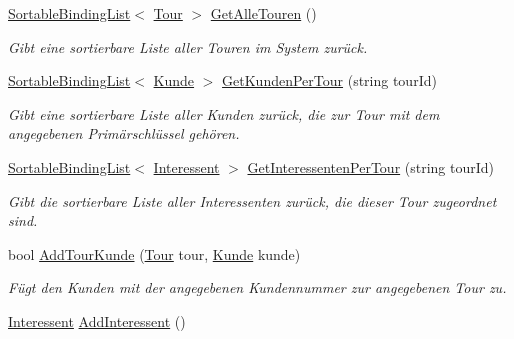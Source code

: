 \begin{DoxyCompactItemize}
\item 
\hyperlink{class_products_1_1_common_1_1_sortable_binding_list}{Sortable\+Binding\+List}$<$ \hyperlink{class_products_1_1_model_1_1_entities_1_1_tour}{Tour} $>$ \hyperlink{class_products_1_1_model_1_1_model_service_a88b7bd84f60f0e33daecd256ad1fedbe}{Get\+Alle\+Touren} ()
\begin{DoxyCompactList}\small\item\em Gibt eine sortierbare Liste aller Touren im System zurück. \end{DoxyCompactList}\item 
\hyperlink{class_products_1_1_common_1_1_sortable_binding_list}{Sortable\+Binding\+List}$<$ \hyperlink{class_products_1_1_model_1_1_entities_1_1_kunde}{Kunde} $>$ \hyperlink{class_products_1_1_model_1_1_model_service_affe72e69d5ef4c9eff6602746e4c8e8a}{Get\+Kunden\+Per\+Tour} (string tour\+Id)
\begin{DoxyCompactList}\small\item\em Gibt eine sortierbare Liste aller Kunden zurück, die zur Tour mit dem angegebenen Primärschlüssel gehören. \end{DoxyCompactList}\item 
\hyperlink{class_products_1_1_common_1_1_sortable_binding_list}{Sortable\+Binding\+List}$<$ \hyperlink{class_products_1_1_model_1_1_entities_1_1_interessent}{Interessent} $>$ \hyperlink{class_products_1_1_model_1_1_model_service_aae65874b0774cfe7b3fab8acd5536bc7}{Get\+Interessenten\+Per\+Tour} (string tour\+Id)
\begin{DoxyCompactList}\small\item\em Gibt die sortierbare Liste aller Interessenten zurück, die dieser Tour zugeordnet sind. \end{DoxyCompactList}\item 
bool \hyperlink{class_products_1_1_model_1_1_model_service_a4e85b399319326391d67dc6a150ca907}{Add\+Tour\+Kunde} (\hyperlink{class_products_1_1_model_1_1_entities_1_1_tour}{Tour} tour, \hyperlink{class_products_1_1_model_1_1_entities_1_1_kunde}{Kunde} kunde)
\begin{DoxyCompactList}\small\item\em Fügt den Kunden mit der angegebenen Kundennummer zur angegebenen Tour zu. \end{DoxyCompactList}\item 
\hyperlink{class_products_1_1_model_1_1_entities_1_1_interessent}{Interessent} \hyperlink{class_products_1_1_model_1_1_model_service_a9508b0742c985d6b6e84c6b62aaca37a}{Add\+Interessent} ()

\end{DoxyCompactItemize}
